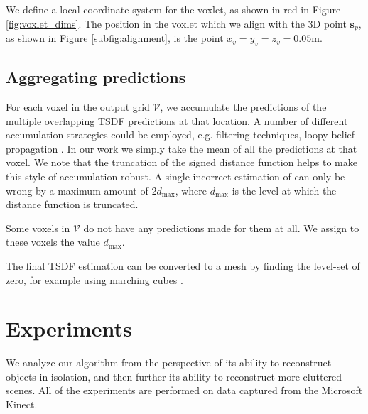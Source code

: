 \documentclass[10pt,twocolumn,letterpaper]{article}
\makeatletter
\renewcommand*{\eg}{e.g.\@\xspace}
\newcommand{\pixelidx}{\mathbf{s}}
\newcommand{\voxelgrid}{\mathcal{V}}
\newcommand{\todo}[1]{\textcolor{red}{TODO: #1}}
\makeatother
\begin{document}
We define a local coordinate system for the voxlet, as shown in red in Figure \ref{fig:voxlet_dims}. 
The position in the voxlet which we align with the 3D point $\pixelidx_p$, as shown in Figure \ref{subfig:alignment}, is the point $x_v = y_v = z_v = 0.05$m.



\subsection{Aggregating predictions}
\label{sec:combining}

For each voxel in the output grid $\voxelgrid$, we accumulate the predictions of the multiple overlapping TSDF predictions at that location.
A number of different accumulation strategies could be employed, \eg filtering techniques, loopy belief propagation \etc.
In our work we simply take the mean of all the predictions at that voxel.
We note that the truncation of the signed distance function helps to make this style of accumulation robust.
A single incorrect estimation of can only be wrong by a maximum amount of $2d_{\max}$, where $d_{\max}$ is the level at which the distance function is truncated.

Some voxels in $\voxelgrid$ do not have any predictions made for them at all. 
We assign to these voxels the value $d_{\max}$.

The final TSDF estimation can be converted to a mesh by finding the level-set of zero, for example using marching cubes \cite{lorensen-siggraph-2013}.


\section{Experiments}

We analyze our algorithm from the perspective of its ability to reconstruct objects in isolation, and then further its ability to reconstruct more cluttered scenes.
All of the experiments are performed on data captured from the Microsoft Kinect.


\end{document}
